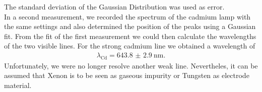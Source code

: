The standard deviation of the Gaussian Distribution was used as error.\\
In a second measurement, we recorded the spectrum of the cadmium lamp with the same settings and also determined the position of the peaks using a Gaussian fit.
From the fit of the first measurement we could then calculate the wavelengths of the two visible lines.
For the strong cadmium line we obtained a wavelength of
\begin{align*}
\lambda_\text{Cd}=\SI{643.8(29)}{\nano\meter}.
\end{align*}
Unfortunately, we were no longer resolve another weak line.
Nevertheles, it can be assumed that Xenon is to be seen as gaseous impurity or Tungsten as electrode material.